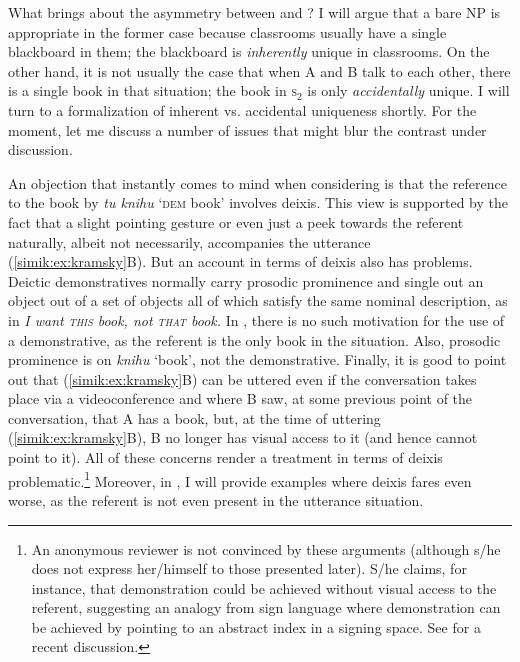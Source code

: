 \documentclass[output=paper,colorlinks,citecolor=brown,newtxmath]{langscibook}
\begin{document}
\noindent What brings about the asymmetry between  and ? I will argue that a bare NP is appropriate in the former case because classrooms usually have a single blackboard in them; the blackboard is \textit{inherently} unique in classrooms. On the other hand, it is not usually the case that when A and B talk to each other, there is a single book in that situation; the book in \textsc{s}$_2$ is only \textit{accidentally} unique. I will turn to a formalization of inherent vs. accidental uniqueness shortly. For the moment, let me discuss a number of issues that might blur the contrast under discussion.

\largerpage[-1] %

An objection that instantly comes to mind when considering  is that the reference to the book by \textit{tu knihu} `\textsc{dem} book' involves deixis. This view is supported by the fact that a slight pointing gesture or even just a peek towards the referent naturally, albeit not necessarily, accompanies the utterance (\ref{simik:ex:kramsky}B). But an account in terms of deixis also has problems. Deictic demonstratives normally carry prosodic prominence and single out an object out of a set of objects all of which satisfy the same nominal description, as in \textit{I want \textsc{this} book, not \textsc{that} book.} In , there is no such motivation for the use of a demonstrative, as the referent is the only book in the situation. Also, prosodic prominence is on \textit{knihu} `book', not the demonstrative. Finally, it is good to point out that (\ref{simik:ex:kramsky}B) can be uttered even if the conversation takes place via a videoconference and where B saw, at some previous point of the conversation, that A has a book, but, at the time of uttering (\ref{simik:ex:kramsky}B), B no longer has visual access to it (and hence cannot point to it). All of these concerns render a treatment in terms of deixis problematic.\footnote{An anonymous reviewer is not convinced by these arguments (although s/he does not express her/himself to those presented later). S/he claims, for instance, that demonstration could be achieved without visual access to the referent, suggesting an analogy from sign language where demonstration can be achieved by pointing to an abstract index in a signing space. See \citet[Ch. 5]{Ahn2019} for a recent discussion.} Moreover, in , I will provide examples where deixis fares even worse, as the referent is not even present in the utterance situation.
\end{document}
